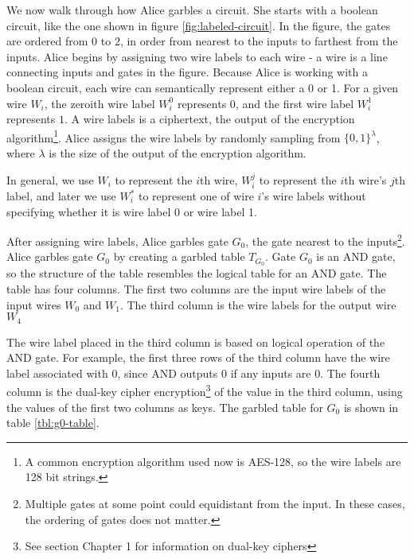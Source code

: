 



We now walk through how Alice garbles a circuit.
She starts with a boolean circuit, like the one shown in figure \ref{fig:labeled-circuit}.
In the figure, the gates are ordered from $0$ to $2$, in order from nearest to the inputs to farthest from the inputs.
Alice begins by assigning two wire labels to each wire - a wire is a line connecting inputs and gates in the figure.
Because Alice is working with a boolean circuit, each wire can semantically represent either a 0 or 1.
For a given wire $W_i$, the zeroith wire label $W_i^0$ represents $0$, and the first wire label $W_i^1$ represents $1$.
A wire labels is a ciphertext, the output of the encryption algorithm\footnote{A common encryption algorithm used now is AES-128, so the wire labels are 128 bit strings.}.
Alice assigns the wire labels by randomly sampling from $\{0,1\}^{\lambda}$, where $\lambda$ is the size of the output of the encryption algorithm.

In general, we use $W_i$ to represent the $i$th wire, $W_i^j$ to represent the $i$th wire's $j$th label, and later we use $W_i^*$ to represent one of wire $i$'s wire labels without specifying whether it is wire label 0 or wire label 1.

After assigning wire labels, Alice garbles gate $G_0$, the gate nearest to the inputs\footnote{Multiple gates at some point could equidistant from the input. In these cases, the ordering of gates does not matter.}.
Alice garbles gate $G_0$ by creating a garbled table $T_{G_0}$.
Gate $G_0$ is an AND gate, so the structure of the table resembles the logical table for an AND gate.
The table has four columns. 
The first two columns are the input wire labels of the input wires $W_0$ and $W_1$.
The third column is the wire labels for the output wire $W_4$

The wire label placed in the third column is based on logical operation of the AND gate.
For example, the first three rows of the third column have the wire label associated with $0$, since AND outputs 0 if any inputs are 0.
The fourth column is the dual-key cipher encryption\footnote{See section Chapter 1 for information on dual-key ciphers} of the value in the third column, using the values of the first two columns as keys.
The garbled table for $G_0$ is shown in table \ref{tbl:g0-table}.

